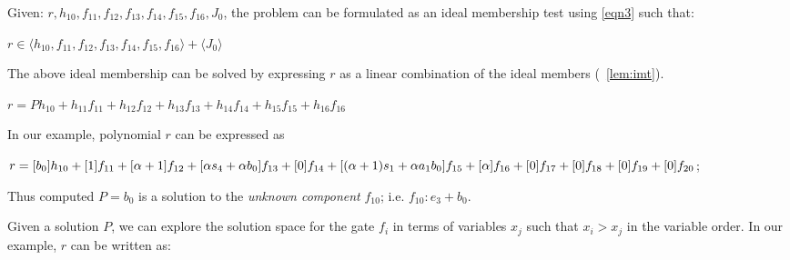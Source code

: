 \begin{Example}
Given: $r,h_{10},f_{11},f_{12},f_{13},f_{14},f_{15},f_{16},J_0$, the
problem can be formulated as an ideal membership test
using \eqref{eqn3} such that: 
\begin{center}
$r \in \langle h_{10},f_{11},f_{12},f_{13},f_{14},f_{15},f_{16}\rangle + \langle J_0\rangle$
\end{center}

The above ideal membership can be solved by expressing $r$ as a
linear combination of the ideal members (~\autoref{lem:imt}). 
\begin{small}
$r = Ph_{10} + h_{11}f_{11} + h_{12}f_{12}+h_{13}f_{13}+h_{14}f_{14}+h_{15}f_{15}+h_{16}f_{16}$ 
\end{small}

In our example, polynomial $r$ can be expressed as

\begin{small}
$r = [b_0]h_{10}+[1]f_{11}+[\alpha+1]f_{12}+[\alpha s_4 +\alpha b_0]f_{13}+[0]f_{14}+[(\alpha+1)s_1+\alpha a_1b_0]f_{15}+[\alpha]f_{16}+[0]f_{17}+[0]f_{18}+[0]f_{19}+[0]f_{20}$;
\end{small}

Thus computed $P=b_0$ is a solution to the \textit{unknown component}
$f_{10}$; i.e. $f_{10}: e_3 + b_0$.

Given a solution $P$, we can explore the solution space for 
the gate $f_i$ in terms of variables $x_j$ such that $x_i>x_j$ in the
variable order.
In our example, $r$ can be written as:


\end{Example}
